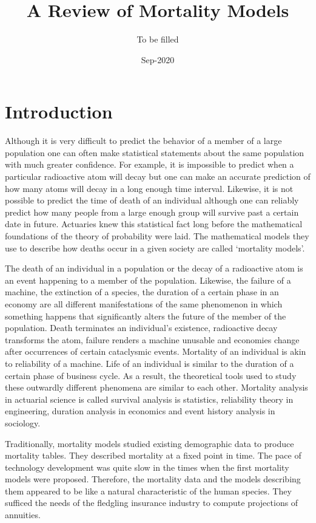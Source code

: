 \documentclass{article}
\title{A Review of Mortality Models}
\author{To be filled}
\date{Sep-2020}
\numberwithin{equation}{section}
\begin{document}
\maketitle
\section{Introduction}\label{s0}
Although it is very difficult to predict the behavior of a member of a large
population one can often make statistical statements about the same population 
with much greater 
confidence. For example, it is impossible to predict when a particular 
radioactive atom will decay but one can make an accurate prediction of how 
many atoms will decay in a long enough time interval. Likewise, it is not
possible to predict the time of death of an individual although one can reliably
predict how many people from a large enough group will survive past a certain
date in future. Actuaries knew this statistical fact long before the 
mathematical foundations of the theory of probability were laid. The 
mathematical models they use to describe how deaths occur in a given society are
called `mortality models'.

The death of an individual in a population or the decay of a radioactive atom
is an event happening to a member of the population. Likewise, the failure of
a machine, the extinction of a species, the duration of a certain phase in an
economy are all different manifestations of the same phenomenon in which 
something happens that significantly alters the future of the member of the
population. Death terminates an individual's existence, radioactive decay
transforms the atom, failure renders a machine unusable and economies change 
after occurrences of certain cataclysmic events. Mortality of an individual
is akin to reliability of a machine. Life of an individual is similar to
the duration of a certain phase of business cycle. As a result, the 
theoretical tools used to study these outwardly different phenomena are similar 
to each other. 
Mortality analysis in actuarial science is called survival analysis is 
statistics, reliability theory in engineering, duration analysis in economics 
and event history analysis in sociology.

Traditionally, mortality models studied existing demographic data to produce
mortality tables. They described mortality at a fixed point in time. The pace 
of technology development was quite slow in the times when the first mortality
models were proposed. Therefore, the mortality data and the models describing
them appeared to be like a natural characteristic of the human species. They
sufficed the needs of the fledgling insurance industry to compute projections
of annuities.
\end{document}
